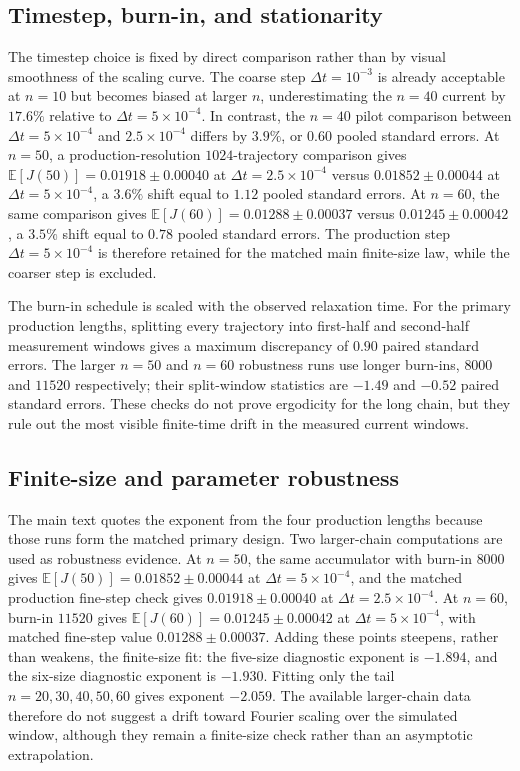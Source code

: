\documentclass[11pt,a4paper]{article}
\theoremstyle{definition}
\newcommand{\E}{\mathbb{E}}
\numberwithin{equation}{section}   %
\begin{document}
\subsection{Timestep, burn-in, and stationarity}
\label{app:timestep-stationarity}

The timestep choice is fixed by direct comparison rather than by visual
smoothness of the scaling curve. The coarse step $\Delta t=10^{-3}$ is already
acceptable at $n=10$ but becomes biased at larger $n$, underestimating the
$n=40$ current by $17.6\%$ relative to $\Delta t=5\times10^{-4}$. In contrast,
the $n=40$ pilot comparison between $\Delta t=5\times10^{-4}$ and
$2.5\times10^{-4}$ differs by $3.9\%$, or $0.60$ pooled standard errors. At
$n=50$, a production-resolution $1024$-trajectory comparison gives
$\E[J(50)]=0.01918\pm0.00040$ at $\Delta t=2.5\times10^{-4}$ versus
$0.01852\pm0.00044$ at $\Delta t=5\times10^{-4}$, a $3.6\%$ shift equal to
$1.12$ pooled standard errors. At $n=60$, the same comparison gives
$\E[J(60)]=0.01288\pm0.00037$ versus $0.01245\pm0.00042$, a $3.5\%$ shift
equal to $0.78$ pooled standard errors. The production step
$\Delta t=5\times10^{-4}$ is therefore retained for the matched main
finite-size law, while the coarser step is excluded.

The burn-in schedule is scaled with the observed relaxation time. For the
primary production lengths, splitting every trajectory into first-half and
second-half measurement windows gives a maximum discrepancy of $0.90$ paired
standard errors. The larger $n=50$ and $n=60$ robustness runs use longer
burn-ins, $8000$ and $11520$ respectively; their split-window statistics are
$-1.49$ and $-0.52$ paired standard errors. These checks do not prove
ergodicity for the long chain, but they rule out the most visible finite-time
drift in the measured current windows.

\subsection{Finite-size and parameter robustness}
\label{app:finite-size-robustness}

The main text quotes the exponent from the four production lengths because
those runs form the matched primary design. Two larger-chain computations are
used as robustness evidence. At $n=50$, the same accumulator with burn-in
$8000$ gives $\E[J(50)]=0.01852\pm0.00044$ at
$\Delta t=5\times10^{-4}$, and the matched production fine-step check gives
$0.01918\pm0.00040$ at $\Delta t=2.5\times10^{-4}$. At $n=60$, burn-in
$11520$ gives $\E[J(60)]=0.01245\pm0.00042$ at
$\Delta t=5\times10^{-4}$, with matched fine-step value
$0.01288\pm0.00037$. Adding these points steepens, rather than
weakens, the finite-size fit: the five-size diagnostic exponent is $-1.894$,
and the six-size diagnostic exponent is $-1.930$. Fitting only the tail
$n=20,30,40,50,60$ gives exponent $-2.059$. The available larger-chain data
therefore do not suggest a drift toward Fourier scaling over the simulated
window, although they remain a finite-size check rather than an asymptotic
extrapolation.
\end{document}
